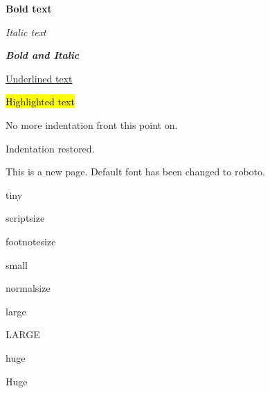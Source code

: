 \documentclass[11pt]{article}    %
\begin{document}
\textbf{Bold text}

\textit{Italic text}

\textbf{\textit{Bold and Italic}}

\underline{Underlined text}

\hl{Highlighted text}

\vspace{1cm}

\noindent
No more indentation front this point on.

\vspace{1cm}
\indent
Indentation restored.
\vspace{1cm}

\newpage
{}  %
This is a new page. Default font has been changed to roboto.

\vspace{1cm}

\tiny{tiny}

\scriptsize{scriptsize}

\footnotesize{footnotesize}

\small{small}

\normalsize{normalsize}

\large{large}

\LARGE{LARGE}

\huge{huge}

\Huge{Huge}
\end{document}
